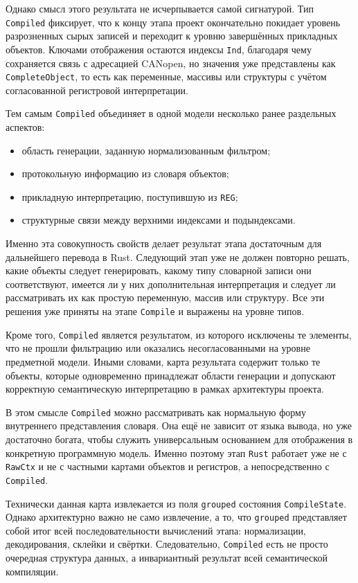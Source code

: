\documentclass[a4paper,12pt]{article}
\begin{document}
Однако смысл этого результата не исчерпывается самой сигнатурой. Тип \texttt{Compiled}
фиксирует, что к концу этапа проект окончательно покидает уровень разрозненных сырых
записей и переходит к уровню завершённых прикладных объектов. Ключами отображения
остаются индексы \texttt{Ind}, благодаря чему сохраняется связь с адресацией CANopen, но
значения уже представлены как \texttt{CompleteObject}, то есть как переменные, массивы
или структуры с учётом согласованной регистровой интерпретации.

Тем самым \texttt{Compiled} объединяет в одной модели несколько ранее раздельных
аспектов:
\begin{itemize}
  \item область генерации, заданную нормализованным фильтром;
  \item протокольную информацию из словаря объектов;
  \item прикладную интерпретацию, поступившую из \texttt{REG};
  \item структурные связи между верхними индексами и подындексами.
\end{itemize}

Именно эта совокупность свойств делает результат этапа достаточным для дальнейшего
перевода в Rust. Следующий этап уже не должен повторно решать, какие объекты следует
генерировать, какому типу словарной записи они соответствуют, имеется ли у них
дополнительная интерпретация и следует ли рассматривать их как простую переменную,
массив или структуру. Все эти решения уже приняты на этапе \texttt{Compile} и выражены
на уровне типов.

Кроме того, \texttt{Compiled} является результатом, из которого исключены те элементы,
что не прошли фильтрацию или оказались несогласованными на уровне предметной модели.
Иными словами, карта результата содержит только те объекты, которые одновременно
принадлежат области генерации и допускают корректную семантическую интерпретацию в
рамках архитектуры проекта.

В этом смысле \texttt{Compiled} можно рассматривать как нормальную форму внутреннего
представления словаря. Она ещё не зависит от языка вывода, но уже достаточно богата,
чтобы служить универсальным основанием для отображения в конкретную программную модель.
Именно поэтому этап \texttt{Rust} работает уже не с \texttt{RawCtx} и не с частными
картами объектов и регистров, а непосредственно с \texttt{Compiled}.

Технически данная карта извлекается из поля \texttt{grouped} состояния
\texttt{CompileState}. Однако архитектурно важно не само извлечение, а то, что
\texttt{grouped} представляет собой итог всей последовательности вычислений этапа:
нормализации, декодирования, склейки и свёртки. Следовательно, \texttt{Compiled} есть
не просто очередная структура данных, а инвариантный результат всей семантической
компиляции.
\end{document}
